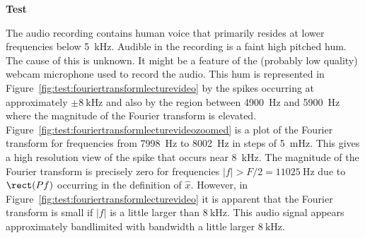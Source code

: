 \documentclass[11pt,a4paper]{book}
\theoremstyle{plain}
\numberwithin{equation}{section}
\newcommand{\abs}[1]{\left\vert #1 \right\vert}
\newcounter{test}
\newenvironment{test}{
\begin{shaded}\refstepcounter{test}\par\noindent%
\textbf{Test \thetest}
}{
\end{shaded}
}
\begin{document}
\begin{test}
The audio recording contains human voice that primarily resides at lower frequencies below \SI{5}{\kilo\hertz}.  Audible in the recording is a faint high pitched hum.  The cause of this is unknown.  It might be a feature of the (probably low quality) webcam microphone used to record the audio.  This hum is represented in Figure~\ref{fig:test:fouriertransformlecturevideo} by the spikes occurring at approximately $\pm\SI{8}{\kilo\hertz}$ and also by the region between \SI{4900}{\hertz} and \SI{5900}{\hertz} where the magnitude of the Fourier transform is elevated.  Figure~\ref{fig:test:fouriertransformlecturevideozoomed} is a plot of the Fourier transform for frequencies from \SI{7998}{\hertz} to \SI{8002}{\hertz} in steps of \SI{5}{\milli\hertz}.  This gives a high resolution view of the spike that occurs near \SI{8}{\kilo\hertz}.  The magnitude of the Fourier transform is precisely zero for frequencies $\abs{f} > F/2 = \SI{11025}{\hertz}$ due to $\rect(Pf)$ occurring in the definition of $\hat{x}$.  However, in Figure~\ref{fig:test:fouriertransformlecturevideo} it is apparent that the Fourier transform is small if $\abs{f}$ is a little larger than $\SI{8}{\kilo\hertz}$.  This audio signal appears approximately bandlimited with bandwidth a little larger $\SI{8}{\kilo\hertz}$.


\end{test}
\end{document}
